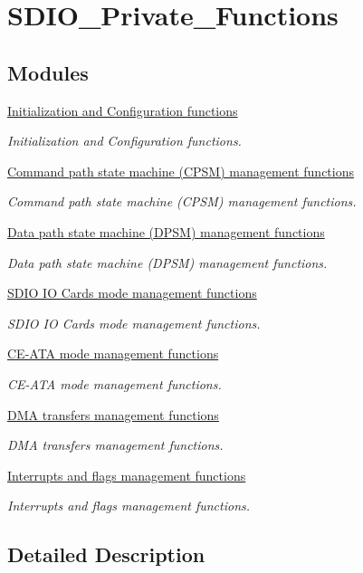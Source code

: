 \hypertarget{group___s_d_i_o___private___functions}{\section{S\-D\-I\-O\-\_\-\-Private\-\_\-\-Functions}
\label{group___s_d_i_o___private___functions}
}
\subsection*{Modules}
\begin{DoxyCompactItemize}
\item 
\hyperlink{group___s_d_i_o___group1}{Initialization and Configuration functions}
\begin{DoxyCompactList}\small\item\em Initialization and Configuration functions. \end{DoxyCompactList}\item 
\hyperlink{group___s_d_i_o___group2}{Command path state machine (\-C\-P\-S\-M) management functions}
\begin{DoxyCompactList}\small\item\em Command path state machine (C\-P\-S\-M) management functions. \end{DoxyCompactList}\item 
\hyperlink{group___s_d_i_o___group3}{Data path state machine (\-D\-P\-S\-M) management functions}
\begin{DoxyCompactList}\small\item\em Data path state machine (D\-P\-S\-M) management functions. \end{DoxyCompactList}\item 
\hyperlink{group___s_d_i_o___group4}{S\-D\-I\-O I\-O Cards mode management functions}
\begin{DoxyCompactList}\small\item\em S\-D\-I\-O I\-O Cards mode management functions. \end{DoxyCompactList}\item 
\hyperlink{group___s_d_i_o___group5}{C\-E-\/\-A\-T\-A mode management functions}
\begin{DoxyCompactList}\small\item\em C\-E-\/\-A\-T\-A mode management functions. \end{DoxyCompactList}\item 
\hyperlink{group___s_d_i_o___group6}{D\-M\-A transfers management functions}
\begin{DoxyCompactList}\small\item\em D\-M\-A transfers management functions. \end{DoxyCompactList}\item 
\hyperlink{group___s_d_i_o___group7}{Interrupts and flags management functions}
\begin{DoxyCompactList}\small\item\em Interrupts and flags management functions. \end{DoxyCompactList}\end{DoxyCompactItemize}


\subsection{Detailed Description}
